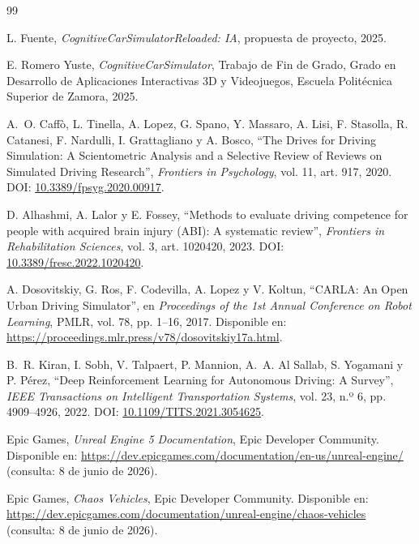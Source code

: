\begin{sloppypar}
\raggedright%
\begin{thebibliography}{99}
%

L. Fuente, \textit{CognitiveCarSimulatorReloaded: IA}, propuesta de proyecto, 2025.

E. Romero Yuste, \textit{CognitiveCarSimulator}, Trabajo de Fin de Grado, Grado en Desarrollo de Aplicaciones Interactivas 3D y Videojuegos, Escuela Politécnica Superior de Zamora, 2025.

A.~O. Caffò, L. Tinella, A. Lopez, G. Spano, Y. Massaro, A. Lisi, F. Stasolla, R. Catanesi, F. Nardulli, I. Grattagliano y A. Bosco, ``The Drives for Driving Simulation: A Scientometric Analysis and a Selective Review of Reviews on Simulated Driving Research'', \textit{Frontiers in Psychology}, vol. 11, art. 917, 2020. DOI\@: \href{https://doi.org/10.3389/fpsyg.2020.00917}{10.3389/fpsyg.2020.00917}.

D. Alhashmi, A. Lalor y E. Fossey, ``Methods to evaluate driving competence for people with acquired brain injury (ABI): A systematic review'', \textit{Frontiers in Rehabilitation Sciences}, vol. 3, art. 1020420, 2023. DOI\@: \href{https://doi.org/10.3389/fresc.2022.1020420}{10.3389/fresc.2022.1020420}.

A. Dosovitskiy, G. Ros, F. Codevilla, A. Lopez y V. Koltun, ``CARLA: An Open Urban Driving Simulator'', en \textit{Proceedings of the 1st Annual Conference on Robot Learning}, PMLR, vol. 78, pp. 1--16, 2017. Disponible en: \url{https://proceedings.mlr.press/v78/dosovitskiy17a.html}.

B.~R. Kiran, I. Sobh, V. Talpaert, P. Mannion, A.~A. Al Sallab, S. Yogamani y P. Pérez, ``Deep Reinforcement Learning for Autonomous Driving: A Survey'', \textit{IEEE Transactions on Intelligent Transportation Systems}, vol. 23, n.º 6, pp. 4909--4926, 2022. DOI\@: \href{https://doi.org/10.1109/TITS.2021.3054625}{10.1109/TITS.2021.3054625}.

Epic Games, \textit{Unreal Engine 5 Documentation}, Epic Developer Community. Disponible en: \url{https://dev.epicgames.com/documentation/en-us/unreal-engine/} (consulta: 8 de junio de 2026).

Epic Games, \textit{Chaos Vehicles}, Epic Developer Community. Disponible en: \url{https://dev.epicgames.com/documentation/unreal-engine/chaos-vehicles} (consulta: 8 de junio de 2026).


\end{thebibliography}
\end{sloppypar}
